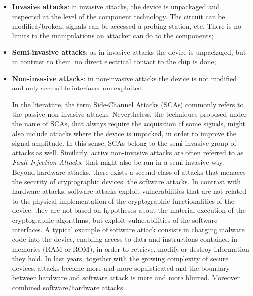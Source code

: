 \begin{itemize}
\item[] \textbf{Invasive attacks}: in invasive attacks, the device is unpackaged and inspected at the level of the component technology. The circuit can be modified/broken, signals can be accessed \via a probing station, etc. There is no limits to the manipulations an attacker can do to the components;
\item[] \textbf{Semi-invasive attacks}: as in invasive attacks the device is unpackaged, but in contrast to them, no direct electrical contact to the chip is done;
\item[] \textbf{Non-invasive attacks}: in non-invasive attacks the device is not modified and only accessible interfaces are exploited. 

In the literature, the term Side-Channel Attacks (SCAs) commonly refers to the passive non-invasive attacks. Nevertheless, the techniques proposed under the name of SCAs, that always require the acquisition of some signals, might also include attacks where the device is unpacked, in order to improve the signal amplitude. In this sense, SCAs belong to the semi-invasive group of attacks as well. Similarly, active non-invasive attacks are often referred to as \emph{Fault Injection Attacks}, that might also be run in a semi-invasive way.\\

Beyond hardware attacks, there exists a second class of attacks that menaces the security of cryptographic devices: the software attacks. In contrast with hardware attacks, software attacks exploit vulnerabilities that are not related to the physical implementation of the cryptographic functionalities of the device: they are not based on hypotheses about the material execution of the cryptographic algorithms, but exploit vulnerabilities of the software interfaces. A typical example of software attack consists in charging malware code into the device, enabling access to data and instructions contained in memories (RAM or ROM), in order to retrieve, modify or destroy information they hold. In last years, together with the growing complexity of secure devices, attacks become more and more sophisticated and the boundary between hardware and software attack is more and more blurred. Moreover combined software/hardware attacks \cite{}.


\end{itemize}

